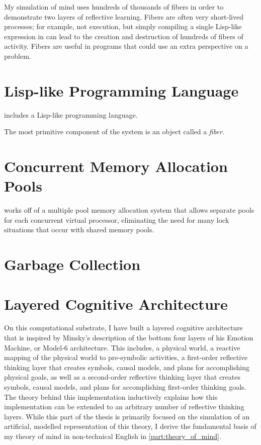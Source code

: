 My simulation of mind uses hundreds of thousands of fibers in order to
demonstrate two layers of reflective learning.  Fibers are often very
short-lived processes; for example, not execution, but simply
compiling a single Lisp-like expression in \FibR can lead to the
creation and destruction of hundreds of fibers of activity.  Fibers
are useful in programs that could use an extra perspective on a
problem.

\section{Lisp-like Programming Language}

\FibR includes a Lisp-like programming language.

The most primitive component of the \FibR system is an object called a
\emph{fiber}.

\section{Concurrent Memory Allocation Pools}

\FibR works off of a multiple pool memory allocation system that
allows separate pools for each concurrent virtual processor,
eliminating the need for many lock situations that occur with shared
memory pools.

\section{Garbage Collection}



\section{Layered Cognitive Architecture}

On this computational substrate, I have built a layered cognitive
architecture that is inspired by Minsky's description of the bottom
four layers of his Emotion Machine, or Model-6 architecture.  This
includes, a physical world, a reactive mapping of the physical world
to pre-symbolic activities, a first-order reflective thinking layer
that creates symbols, causal models, and plans for accomplishing
physical goals, as well as a second-order reflective thinking layer
that creates symbols, causal models, and plans for accomplishing
first-order thinking goals.  The theory behind this implementation
inductively explains how this implementation can be extended to an
arbitrary number of reflective thinking layers.  While this part of
the thesis is primarily focused on the simulation of an artificial,
modelled representation of this theory, I derive the fundamental basis
of my theory of mind in non-technical English in
\autoref{part:theory_of_mind}.

